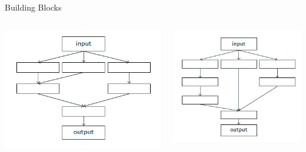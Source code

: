 \documentclass{beamer}
\begin{document}
\begin{frame}{Building Blocks}
    \begin{columns}[c]
    \begin{column}{0.5\textwidth}
        \begin{center}
              \includegraphics[width=0.9\linewidth]{NAS/cell-1.png}
        \end{center}
    \end{column}
    \begin{column}{0.5\textwidth}
        \begin{center}
              \includegraphics[width=0.8\linewidth]{NAS/cell-2.png}
        \end{center}
    \end{column}
\end{columns}

\end{frame}
\end{document}

